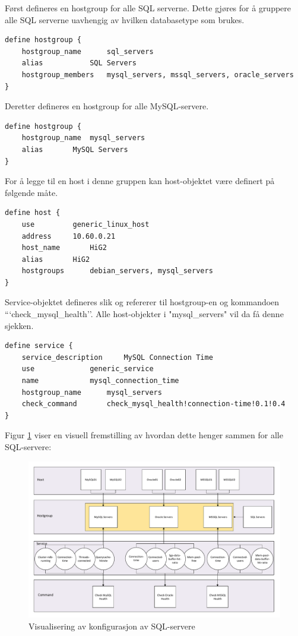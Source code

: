 Først defineres en hostgroup for alle SQL serverne. Dette gjøres for å gruppere alle SQL serverne uavhengig av hvilken databasetype som brukes. 
\begin{lstlisting}[style=example]
define hostgroup {
    hostgroup_name		sql_servers
    alias 			SQL Servers
    hostgroup_members	mysql_servers, mssql_servers, oracle_servers
}
\end{lstlisting}
Deretter defineres en hostgroup for alle MySQL-servere.
\begin{lstlisting}[style=example]
define hostgroup {
    hostgroup_name 	mysql_servers
    alias 		MySQL Servers
}
\end{lstlisting}
For å legge til en host i denne gruppen kan host-objektet være definert på følgende måte.
\begin{lstlisting}[style=example]
define host {
    use			generic_linux_host
    address		10.60.0.21
    host_name		HiG2
    alias		HiG2
    hostgroups		debian_servers, mysql_servers
}
\end{lstlisting}
Service-objektet defineres slik og refererer til hostgroup-en og kommandoen ```check\_mysql\_health''. Alle host-objekter i "mysql\_servers" vil da få denne sjekken.
\begin{lstlisting}[style=example]
define service {
    service_description		MySQL Connection Time
    use		 		generic_service
    name 			mysql_connection_time
    hostgroup_name 		mysql_servers
    check_command 		check_mysql_health!connection-time!0.1!0.4
}
\end{lstlisting}

Figur \ref{sql} viser en visuell fremstilling av hvordan dette henger sammen for alle SQL-servere:

\begin{changemargin}{-1cm}{-1cm}
\begin{figure}[H]
    \centering
    \includegraphics[scale=0.55]{img/sql}
    \caption{Visualisering av konfigurasjon av SQL-servere}
    \label{sql}
\end{figure}
\end{changemargin}
\clearpage

